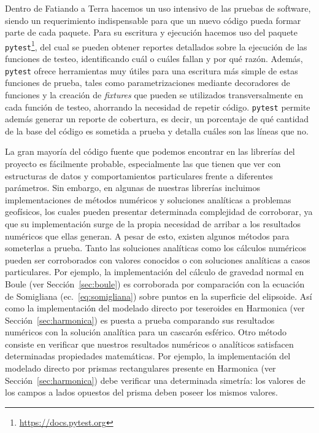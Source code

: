 Dentro de Fatiando a Terra hacemos un uso intensivo de las pruebas de software,
siendo un requerimiento indispensable para que un nuevo código pueda formar
parte de cada paquete.
Para su escritura y ejecución hacemos uso del paquete
\texttt{pytest}\footnote{\url{https://docs.pytest.org}}, del cual se pueden
obtener reportes detallados sobre la ejecución de las funciones de testeo,
identificando cuál o cuáles fallan y por qué razón.
Además, \texttt{pytest} ofrece herramientas muy útiles para una escritura más
simple de estas funciones de prueba, tales como parametrizaciones mediante
decoradores de funciones y la creación de \emph{fixtures} que pueden se
utilizados transversalmente en cada función de testeo, ahorrando la necesidad
de repetir código.
\texttt{pytest} permite además generar un reporte de cobertura, es decir, un
porcentaje de qué cantidad de la base del código es sometida a prueba y
detalla cuáles son las líneas que no.

La gran mayoría del código fuente que podemos encontrar en las librerías del
proyecto es fácilmente probable, especialmente las que tienen que ver con
estructuras de datos y comportamientos particulares frente a diferentes
parámetros.
Sin embargo, en algunas de nuestras librerías incluimos implementaciones de
métodos numéricos y soluciones analíticas a problemas geofísicos, los cuales
pueden presentar determinada complejidad de corroborar, ya que su
implementación surge de la propia necesidad de arribar a los resultados
numéricos que ellas generan.
A pesar de esto, existen algunos métodos para someterlas a prueba.
Tanto las soluciones analíticas como los cálculos numéricos pueden ser
corroborados con valores conocidos o con soluciones analíticas a casos
particulares.
Por ejemplo, la implementación del cálculo de gravedad normal en Boule (ver
Sección~\ref{sec:boule}) es corroborada por comparación con la ecuación de
Somigliana (ec.~\ref{eq:somigliana}) sobre puntos en la superficie del
elipsoide.
Así como la implementación del modelado directo por teseroides en Harmonica
(ver Sección~\ref{sec:harmonica}) es puesta a prueba comparando sus resultados
numéricos con la solución analítica para un cascarón esférico.
Otro método consiste en verificar que nuestros resultados numéricos
o analíticos satisfacen determinadas propiedades matemáticas.
Por ejemplo, la implementación del modelado directo por prismas rectangulares
presente en Harmonica (ver Sección~\ref{sec:harmonica}) debe verificar una
determinada simetría: los valores de los campos a lados opuestos del prisma
deben poseer los mismos valores.

